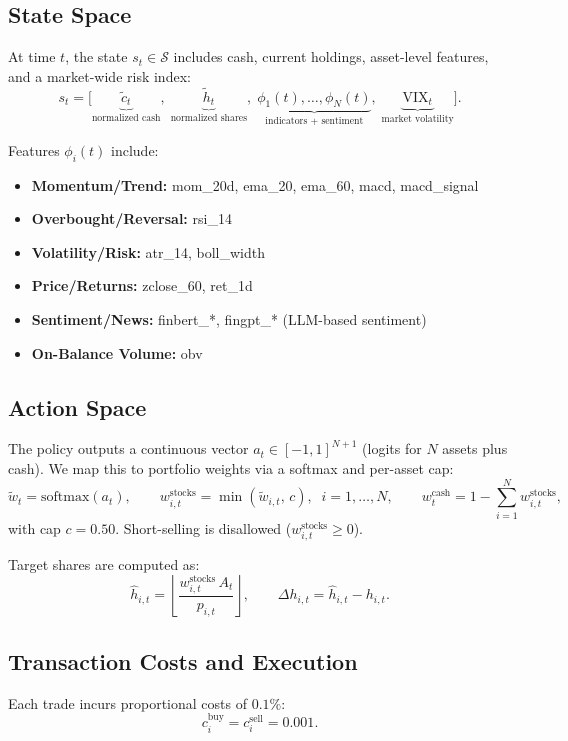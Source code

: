 \documentclass[12pt,a4paper]{report}
\begin{document}
\subsection*{State Space}
At time \(t\), the state \(s_t \in \mathcal{S}\) includes cash, current 
holdings, asset-level features, and a market-wide risk index:
\[
s_t = \big[ \underbrace{\tilde{c}_t}_{\text{normalized cash}}, \;
\underbrace{\tilde{h}_t}_{\text{normalized shares}}, \;
\underbrace{\phi_1(t), \ldots, \phi_N(t)}_{\text{indicators + sentiment}}, \;
\underbrace{\text{VIX}_t}_{\text{market volatility}} \big].
\]

Features \(\phi_i(t)\) include:
\begin{itemize}
    \item \textbf{Momentum/Trend:} mom\_20d, ema\_20, ema\_60, macd, macd\_signal
    \item \textbf{Overbought/Reversal:} rsi\_14
    \item \textbf{Volatility/Risk:} atr\_14, boll\_width
    \item \textbf{Price/Returns:} zclose\_60, ret\_1d
    \item \textbf{Sentiment/News:} finbert\_*, fingpt\_* (LLM-based sentiment)
    \item \textbf{On-Balance Volume:} obv
\end{itemize}

\subsection*{Action Space}
The policy outputs a continuous vector \(a_t \in [-1,1]^{N+1}\) 
(logits for \(N\) assets plus cash). We map this to portfolio weights via 
a softmax and per-asset cap:
\[
\tilde{w}_t = \text{softmax}(a_t), \qquad
w^{\text{stocks}}_{i,t} = \min(\tilde{w}_{i,t}, \, c), \;\; i=1,\ldots,N,
\qquad
w^{\text{cash}}_t = 1 - \sum_{i=1}^N w^{\text{stocks}}_{i,t},
\]
with cap \(c=0.50\). Short-selling is disallowed 
(\(w^{\text{stocks}}_{i,t} \ge 0\)).

Target shares are computed as:
\[
\hat{h}_{i,t} = \left\lfloor \frac{w^{\text{stocks}}_{i,t} \, A_t}{p_{i,t}} \right\rfloor, 
\qquad
\Delta h_{i,t} = \hat{h}_{i,t} - h_{i,t}.
\]

\subsection*{Transaction Costs and Execution}
Each trade incurs proportional costs of \(0.1\%\):
\[
c^{\text{buy}}_i = c^{\text{sell}}_i = 0.001.
\]
\end{document}
